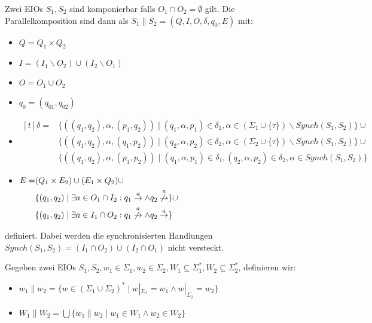 \begin{Def}[Parallelkomposition]
  Zwei EIOs $S_1, S_2$ sind komponierbar falls
  $O_1\cap O_2=\emptyset$ gilt. Die Parallelkomposition sind dann als
  $S_1\|S_2=(Q,I,O,\delta ,q_0,E)$ mit:
  \begin{itemize}
    \item $Q=Q_1\times Q_2$
    \item $I=(I_1\backslash O_2)\cup(I_2\backslash O_1)$
    \item $O=O_1\cup O_2$
    \item $q_0=(q_{01},q_{02})$
    \item $\begin{aligned}[t]
    \delta =&\{((q_1,q_2),\alpha ,(p_1,q_2))\mid (q_1,\alpha ,p_1)\in\delta
      _1,\alpha\in(\Sigma _1\cup\{\tau\})\backslash Synch(S_1,S_2)\}\cup\\
      &\{((q_1,q_2),\alpha ,(q_1,p_2))\mid (q_2,\alpha ,p_2)\in\delta
      _2,\alpha\in(\Sigma _2\cup\{\tau\})\backslash Synch(S_1,S_2)\}\cup\\
      &\{((q_1,q_2),\alpha ,(p_1,p_2))\mid (q_1,\alpha ,p_1)\in\delta
      _1, (q_2,\alpha ,p_2)\in\delta _2, \alpha\in Synch(S_1,S_2)\}
  \end{aligned}$
    \item $\begin{aligned}[t]
    E=&(Q_1\times E_2)\cup (E_1\times Q_2)\cup\\
      &\{(q_1,q_2)\mid \exists a\in O_1\cap I_2: q_1\overset{a}{\rightarrow}\wedge
  q_2\overset{a}{\not{\hspace{-0.1cm}\rightarrow}}\}\cup\\
  &\{(q_1,q_2)\mid \exists a\in I_1\cap O_2:
q_1\overset{a}{\not{\hspace{-0.1cm}\rightarrow}}\wedge
q_2\overset{a}{\rightarrow}\}
  \end{aligned}$
  \end{itemize}
  definiert. Dabei werden die synchronisierten Handlungen $Synch(S_1,
  S_2)=(I_1\cap O_2)\cup(I_2\cap O_1)$ nicht versteckt.
\end{Def}

\begin{Def}
  Gegeben zwei EIOs $S_1, S_2,
  w_1\in\Sigma _1, w_2\in\Sigma _2, W_1\subseteq\Sigma _1^*, W_2\subseteq\Sigma
  _2^*$, definieren wir:
  \begin{itemize}
    \item $w_1\| w_2=\{w\in (\Sigma _1\cup\Sigma _2)^*\mid w|_{\Sigma _1}=w_1\wedge
      w|_{\Sigma _2}=w_2\}$
    \item $W_1\| W_2=\bigcup\{w_1\| w_2\mid w_1\in W_1\wedge w_2\in W_2\}$
  \end{itemize}
\end{Def}

